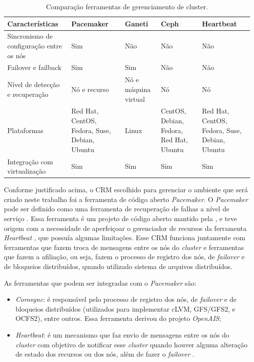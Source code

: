 \begin{table}[h!]
\caption{Comparação ferramentas de gerenciamento de cluster.}
\label{tab:clusterger}
\begin{center}
\begin{tabular}{|p{3.5cm}|p{2.7cm}|p{2cm}|p{2.7cm}|p{2.7cm}|}\hline
Características & Pacemaker & Ganeti & Ceph & Heartbeat \\\hline
Sincronismo de configuração entre os nós & Sim & Não & Não & Não \\\hline
Failover e failback & Sim & Sim & Não & Não \\\hline
Nível de detecção e recuperação & Nó e recurso & Nó e máquina virtual & Nó & Nó \\\hline
Plataformas & Red Hat, CentOS, Fedora, Suse, Debian, Ubuntu & Linux & CentOS, Debian, Fedora, Red Hat, Ubuntu & Red Hat, CentOS, Fedora, Suse, Debian, Ubuntu \\\hline
Integração com virtualização & Sim & Sim & Sim & Sim \\\hline
\end{tabular}
\end{center}
\end{table}


Conforme justificado acima, o \ac{CRM} escolhido para gerenciar o ambiente que será criado neste trabalho foi a ferramenta de código aberto 
\textit{Pacemaker}. 
O \textit{Pacemaker} \cite{pacemaker} pode ser definido como uma ferramenta de recuperação de falhas a nível de serviço \cite{perkov2011}. 
Essa ferramenta é um projeto de código aberto mantido pela \cite{clusterlabs}, e teve origem com a necessidade de aperfeiçoar o gerenciador 
de recursos da ferramenta \textit{Heartbeat} \cite{heartbeat}, que possuía algumas limitações. Esse \ac{CRM} funciona juntamente com ferramentas
que fazem troca de mensagens entre os nós do \textit{cluster} e ferramentas que fazem a afiliação, ou seja, fazem o processo de registro dos
nós, de \textit{failover} e de bloqueios distribuídos, quando utilizado sistema de arquivos distribuídos. 

As ferramentas que podem ser integradas com o \textit{Pacemaker} são:
\begin{itemize}
 \item \textit{Corosync}: é responsável pelo processo de registro dos nós, de \textit{failover} e de bloqueios distribuídos (utilizados para 
 implementar cLVM, GFS/GFS2, e OCFS2), entre outros. Essa ferramenta derivou do projeto \textit{OpenAIS};
 \item \textit{Heartbeat}: é um mecanismo que faz envio de mensagens entre os nós do \textit{cluster} com objetivo de notificar esse 
 \textit{cluster} quando houver alguma alteração de estado dos recursos ou dos nós, além de fazer o \textit{failover} \cite{clusterlabs}.
\end{itemize}


